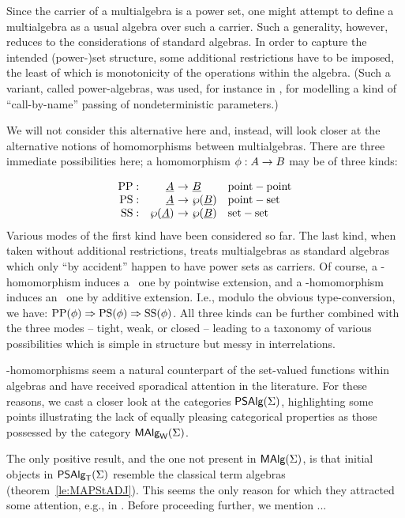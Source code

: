 \documentclass[10pt]{article}
\begin{document}
Since the carrier of a multialgebra is a power set, one might attempt
to define a multialgebra as a usual algebra over such a carrier.  Such
a generality, however, reduces to the considerations of standard
algebras. In order to capture the intended (power-)set structure, some
additional restrictions have to be imposed, the least of which is
monotonicity of the operations within the algebra. (Such a variant,
called power-algebras, was used, for instance in \cite{c:130}, for
modelling a kind of ``call-by-name'' passing of nondeterministic
parameters.)

We will not consider this alternative here and, instead, will look
closer at the alternative notions of homomorphisms between
multialgebras. There are three
immediate possibilities here; a homomorphism $\phi:A\rightarrow B$ may be of
three kinds:

\[ \begin{array}{rr@{\ \into\ }ll}
\PP: & \under A & \under B & {\rm point-point} \\
\PS: & \under A & \PSet(\under B) & {\rm point-set} \\
\SSs:& \PSet(\under A) & \PSet(\under B) & {\rm set-set}
\end{array}
\]
%
Various modes of the first kind have been considered so far.  The last
kind, when taken without additional restrictions, treats multialgebras
as standard algebras which only ``by accident'' happen to have power
sets as carriers.  Of course, a \PP-homomorphism induces a \PS\ one by
pointwise extension, and a \PS-homomorphism induces an \SSs\ one by
additive extension.  I.e., modulo the obvious type-conversion, we
have: ${\rm PP}(\phi) \Rightarrow {\rm PS}(\phi) \Rightarrow {\rm SS}(\phi)$. All three
kinds can be further combined with the three modes -- tight, weak, or
closed -- leading to a taxonomy of various possibilities which is
simple in structure but messy in interrelations.

\PS-homomorphisms seem a natural counterpart of the set-valued functions within
algebras and have received sporadical attention in the literature. 
For these reasons, we cast a closer look at 
the categories $\mbox{\sf PSAlg}(\Sigma)$, highlighting some points
illustrating the lack of equally pleasing categorical properties as
those possessed by the category $\mbox{\rm\sf MAlg}_{\sf W}(\Sigma)$.  

The only positive result, and
the one not present in $\mbox{\rm\sf MAlg}(\Sigma)$, is that initial objects
in $\mbox{\sf PSAlg}_{\sf T}(\Sigma)$ resemble the classical term algebras
(theorem~\ref{le:MAPStADJ}). This seems the only reason for which they 
attracted some attention, e.g., in \cite{c:57,c:59}.
 Before proceeding further, we mention ...
%
\end{document}
